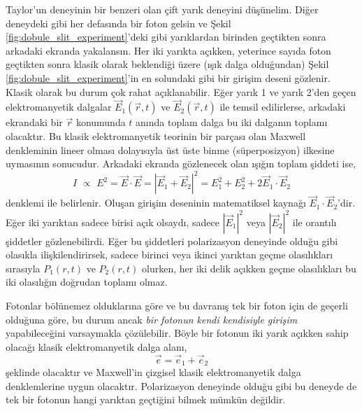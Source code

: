 \documentclass[00_kitap.tex]{subfiles}
\begin{document}
Taylor'un deneyinin bir benzeri olan çift yarık deneyini düşünelim. Diğer deneydeki gibi her defasında bir foton gelsin ve Şekil \ref{fig:dobule_slit_experiment}'deki gibi yarıklardan birinden geçtikten sonra arkadaki ekranda yakalansın. Her iki yarıkta açıkken, yeterince sayıda foton geçtikten sonra klasik olarak beklendiği üzere (ışık dalga olduğundan) Şekil \ref{fig:dobule_slit_experiment}'in en solundaki gibi bir girişim deseni gözlenir. Klasik olarak bu durum çok rahat açıklanabilir. Eğer yarık 1 ve yarık 2'den geçen elektromanyetik dalgalar $\vec E_1(\vec r, t)$ ve $\vec E_2(\vec r, t)$ ile temsil edilirlerse, arkadaki ekrandaki bir $\vec r$ konumunda $t$ anında toplam dalga bu iki dalganın toplamı olacaktır. Bu klasik elektromanyetik teorinin bir parçası olan Maxwell denkleminin lineer olması dolayısıyla üst üste binme (süperposizyon) ilkesine uymasının sonucudur. Arkadaki ekranda gözlenecek olan ışığın toplam şiddeti ise,
\begin{equation}
I \,\, \propto\,\, E^2 = \vec E \cdot \vec E = |\vec E_1 + \vec E_2|^2 = E_1^2 + E_2^2 + 2\vec E_1 \cdot \vec E_2
\label{eq:foton_interference}
\end{equation}
denklemi ile belirlenir. Oluşan girişim deseninin matematiksel kaynağı $\vec E_1 \cdot \vec E_2$'dir. Eğer iki yarıktan sadece birisi açık olsaydı, sadece $|\vec E_1|^2$ veya $|\vec E_2|^2$ ile orantılı şiddetler gözlenebilirdi. Eğer bu şiddetleri polarizasyon deneyinde olduğu gibi olasıkla ilişkilendirirsek, sadece birinci veya ikinci yarıktan geçme olasılıkları sırasıyla $P_1(r,t)$ ve $P_2(r,t)$ olurken, her iki delik açıkken geçme olasılıkları bu iki olasılığın doğrudan toplamı olmaz.

Fotonlar bölünemez olduklarına göre ve bu davranış tek bir foton için de geçerli olduğuna göre, bu durum ancak \emph{bir fotonun kendi kendisiyle girişim} yapabileceğini varsaymakla çözülebilir. Böyle bir fotonun iki yarık açıkken sahip olacağı klasik elektromanyetik dalga alanı,
\begin{equation}
\vec e = \vec e_1 + \vec e_2
\label{eq:single_foton_em_field}
\end{equation}
şeklinde olacaktır ve Maxwell'in çizgisel klasik elektromanyetik dalga denklemlerine uygun olacaktır. Polarizasyon deneyinde olduğu gibi bu deneyde de tek bir fotonun hangi yarıktan geçtiğini bilmek mümkün değildir.
\end{document}
